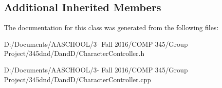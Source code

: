 \subsection*{Additional Inherited Members}


The documentation for this class was generated from the following files\+:\begin{DoxyCompactItemize}
\item 
D\+:/\+Documents/\+A\+A\+S\+C\+H\+O\+O\+L/3-\/ Fall 2016/\+C\+O\+M\+P 345/\+Group Project/345dnd/\+Dand\+D/Character\+Controller.\+h\item 
D\+:/\+Documents/\+A\+A\+S\+C\+H\+O\+O\+L/3-\/ Fall 2016/\+C\+O\+M\+P 345/\+Group Project/345dnd/\+Dand\+D/Character\+Controller.\+cpp\end{DoxyCompactItemize}
